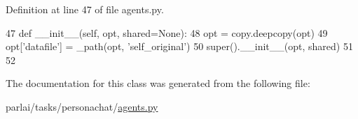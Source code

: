 Definition at line 47 of file agents.\+py.


\begin{DoxyCode}
47     \textcolor{keyword}{def }\_\_init\_\_(self, opt, shared=None):
48         opt = copy.deepcopy(opt)
49         opt[\textcolor{stringliteral}{'datafile'}] = \_path(opt, \textcolor{stringliteral}{'self\_original'})
50         super().\_\_init\_\_(opt, shared)
51 
52 
\end{DoxyCode}


The documentation for this class was generated from the following file\+:\begin{DoxyCompactItemize}
\item 
parlai/tasks/personachat/\hyperlink{parlai_2tasks_2personachat_2agents_8py}{agents.\+py}\end{DoxyCompactItemize}
